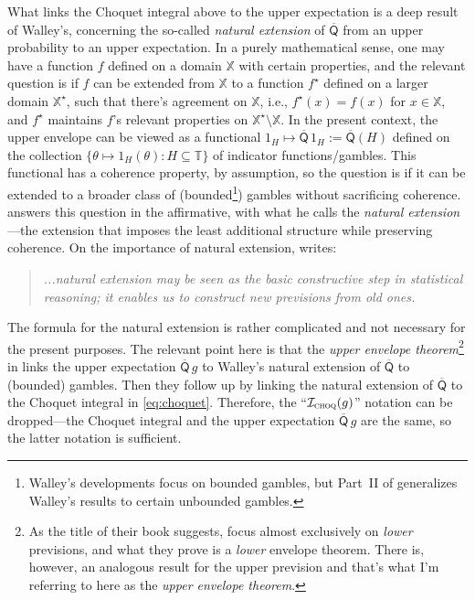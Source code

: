 \documentclass[a4paper, 12pt]{article}
\theoremstyle{plain}
\theoremstyle{definition}
\theoremstyle{remark}
\newcommand{\XX}{\mathbb{X}}
\newcommand{\TT}{\mathbb{T}}
\newcommand{\uprior}{\overline{\mathsf{Q}}}
\begin{document}
What links the Choquet integral above to the upper expectation is a deep result of Walley's, concerning the so-called {\em natural extension} of $\uprior$ from an upper probability to an upper expectation.  In a purely mathematical sense, one may have a function $f$ defined on a domain $\XX$ with certain properties, and the relevant question is if $f$ can be extended from $\XX$ to a function $f^\star$ defined on a larger domain $\XX^\star$, such that there's agreement on $\XX$, i.e., $f^\star(x) = f(x)$ for $x \in \XX$, and $f^\star$ maintains $f$'s relevant properties on $\XX^\star \setminus \XX$.  In the present context, the upper envelope can be viewed as a functional $1_H \mapsto \uprior\,1_H := \uprior(H)$ defined on the collection $\{\theta \mapsto 1_H(\theta): H \subseteq \TT\}$ of indicator functions/gambles.  This functional has a coherence property, by assumption, so the question is if it can be extended to a broader class of (bounded\footnote{Walley's developments focus on bounded gambles, but Part~II of \citet{lower.previsions.book} generalizes Walley's results to certain unbounded gambles.}) gambles without sacrificing coherence.  \citet[][Ch.~3]{walley1991} answers this question in the affirmative, with what he calls the {\em natural extension}---the extension that imposes the least additional structure while preserving coherence.  On the importance of natural extension, \citet[][p.~121--122]{walley1991} writes:
\begin{quote}
{\em ...natural extension may be seen as the basic constructive step in statistical reasoning; it enables us to construct new previsions from old ones.}
\end{quote}
The formula for the natural extension is rather complicated and not necessary for the present purposes.  The relevant point here is that the {\em upper envelope theorem}\footnote{As the title of their book suggests, \citet{lower.previsions.book} focus almost exclusively on {\em lower} previsions, and what they prove is a {\em lower} envelope theorem.  There is, however, an analogous result for the upper prevision and that's what I'm referring to here as the {\em upper envelope theorem}.} in \citet[][Theorem~4.38]{lower.previsions.book} links the upper expectation $\uprior\,g$ to Walley's natural extension of $\uprior$ to (bounded) gambles.  Then they follow up \citep[][Theorem~6.14]{lower.previsions.book} by linking the natural extension of $\uprior$ to the Choquet integral in \eqref{eq:choquet}.  Therefore, the ``$\mathcal{I}_\text{\sc choq}(g)$'' notation can be dropped---the Choquet integral and the upper expectation $\uprior\,g$ are the same, so the latter notation is sufficient.
\end{document}
